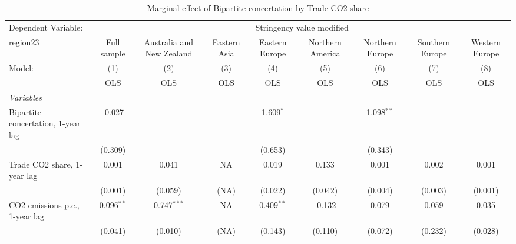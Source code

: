 
\begin{table}[htbp]
   \caption{Marginal effect of Bipartite concertation by Trade CO2 share}
   \centering
   \begin{tabular}{lcccccccc}
      \toprule
      Dependent Variable: & \multicolumn{8}{c}{Stringency value modified}\\
      region23                                                         & Full sample   & Australia and New Zealand & Eastern Asia & Eastern Europe & Northern America & Northern Europe & Southern Europe & Western Europe \\   
      Model:                                                           & (1)           & (2)                       & (3)          & (4)            & (5)              & (6)             & (7)             & (8)\\  
                                                                       &  OLS          & OLS                       & OLS          & OLS            & OLS              & OLS             & OLS             & OLS\\  
      \midrule
      \emph{Variables}\\
      Bipartite concertation, 1-year lag                               & -0.027        &                           &              & 1.609$^{*}$    &                  & 1.098$^{**}$    &                 &   \\   
                                                                       & (0.309)       &                           &              & (0.653)        &                  & (0.343)         &                 &   \\   
      Trade CO2 share, 1-year lag                                      & 0.001         & 0.041                     & NA           & 0.019          & 0.133            & 0.001           & 0.002           & 0.001\\   
                                                                       & (0.001)       & (0.059)                   & (NA)         & (0.022)        & (0.042)          & (0.004)         & (0.003)         & (0.001)\\   
      CO2 emissions p.c., 1-year lag                                   & 0.096$^{**}$  & 0.747$^{***}$             & NA           & 0.409$^{**}$   & -0.132           & 0.079           & 0.059           & 0.035\\   
                                                                       & (0.041)       & (0.010)                   & (NA)         & (0.143)        & (0.110)          & (0.072)         & (0.232)         & (0.028)\\   

\end{tabular}
\end{table}
